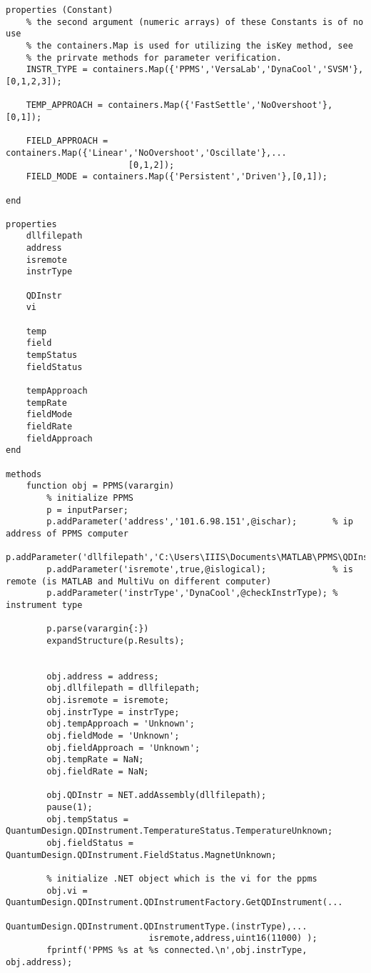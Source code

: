 \begin{lstlisting}
properties (Constant)
    % the second argument (numeric arrays) of these Constants is of no use
    % the containers.Map is used for utilizing the isKey method, see
    % the prirvate methods for parameter verification.
    INSTR_TYPE = containers.Map({'PPMS','VersaLab','DynaCool','SVSM'},[0,1,2,3]);
    
    TEMP_APPROACH = containers.Map({'FastSettle','NoOvershoot'},[0,1]);
    
    FIELD_APPROACH = containers.Map({'Linear','NoOvershoot','Oscillate'},...
                        [0,1,2]);
    FIELD_MODE = containers.Map({'Persistent','Driven'},[0,1]);
    
end

properties
    dllfilepath
    address
    isremote
    instrType
    
    QDInstr
    vi
    
    temp
    field
    tempStatus
    fieldStatus
    
    tempApproach
    tempRate
    fieldMode
    fieldRate
    fieldApproach
end

methods
    function obj = PPMS(varargin)
        % initialize PPMS
        p = inputParser;
        p.addParameter('address','101.6.98.151',@ischar);       % ip address of PPMS computer
        p.addParameter('dllfilepath','C:\Users\IIIS\Documents\MATLAB\PPMS\QDInstrument.dll',@ischar);
        p.addParameter('isremote',true,@islogical);             % is remote (is MATLAB and MultiVu on different computer)
        p.addParameter('instrType','DynaCool',@checkInstrType); % instrument type
        
        p.parse(varargin{:})
        expandStructure(p.Results);
        
        
        obj.address = address;
        obj.dllfilepath = dllfilepath;
        obj.isremote = isremote;
        obj.instrType = instrType;
        obj.tempApproach = 'Unknown';
        obj.fieldMode = 'Unknown';
        obj.fieldApproach = 'Unknown';
        obj.tempRate = NaN;
        obj.fieldRate = NaN;
        
        obj.QDInstr = NET.addAssembly(dllfilepath);
        pause(1);
        obj.tempStatus = QuantumDesign.QDInstrument.TemperatureStatus.TemperatureUnknown;
        obj.fieldStatus = QuantumDesign.QDInstrument.FieldStatus.MagnetUnknown;
        
        % initialize .NET object which is the vi for the ppms
        obj.vi = QuantumDesign.QDInstrument.QDInstrumentFactory.GetQDInstrument(...
                            QuantumDesign.QDInstrument.QDInstrumentType.(instrType),...
                            isremote,address,uint16(11000) );
        fprintf('PPMS %s at %s connected.\n',obj.instrType, obj.address);
        

\end{lstlisting}
